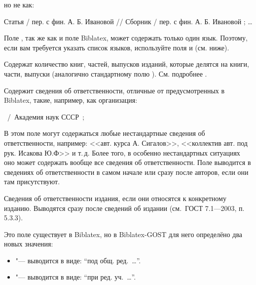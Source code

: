 \documentclass[10pt,a4paper,headings=small,numbers=enddot,english,russian]{ltxdockit}
\newcommand*{\biblatex}{Biblatex\xspace}
\newcommand*{\biblatexgost}{Biblatex-GOST\xspace}
\newcommand*{\gostbibname}[1][]{ГОСТ#1 7.1---2003\xspace}
\newcommand*{\gostbibref}[2][]{\gostbibname[#1], п.\,#2\xspace}
\newenvironment{bibexample}{\begin{list}
     {}
     {\setlength{\leftmargin}{\parindent}%
      \setlength{\itemindent}{-\leftmargin}%
      \setlength{\parsep}{0pt}}}
  {\end{list}}
\begin{document}
\begin{fieldlist}
но не как:

\begin{bibexample}
\item Статья / пер. с фин. А. Б. Ивановой // Сборник / пер. с фин. А. Б. Ивановой ; \ldots
\end{bibexample}

Поле , так же как и поле \biblatex {},
может содержать только один язык. Поэтому, если вам требуется указать список языков,
используйте поля  и  (см. ниже).


Содержат количество книг, частей, выпусков изданий,
которые делятся на книги, части, выпуски (аналогично стандартному полю ). См.
подробнее .


Содержит сведения об ответственности, отличные от предусмотренных в \biblatex,
такие, например, как организация:

\begin{bibexample}
\item \textellipsis\ \slash\ Академия наук СССР\ ;\ \textellipsis
\end{bibexample}

В этом поле могут содержаться любые нестандартные сведения об ответственности,
например: <<авт. курса А. Сигалов>>,
<<коллектив авт. под рук. Исакова Ю.Ф>> и т.\,д.
Более того, в особенно нестандартных ситуациях
оно может содержать вообще все сведения об ответственности.
Поле  выводится в сведениях об ответственности в самом начале или
сразу после авторов, если они там присутствуют.


Сведения об ответственности издания, если они относятся к конкретному изданию.
Выводятся сразу после сведений об издании (см.~\gostbibref{5.3.3}).


Это поле существует в \biblatex, но в \biblatexgost для него определёно два новых
значения:
\begin{itemize}
\item {} "--- выводится в виде: \enquote{под общ. ред.~\ldots}.
\item {} "--- выводится в виде: \enquote{при ред. уч.~\ldots}.
\end{itemize}


\end{fieldlist}
\end{document}
